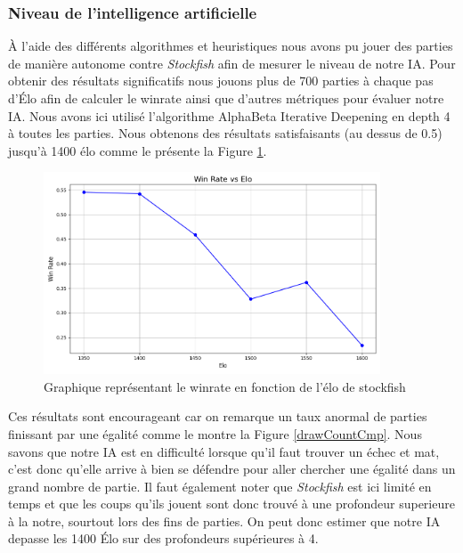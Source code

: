 \documentclass{article}
\begin{document}
\subsubsection{Niveau de l'intelligence artificielle}
À l'aide des différents algorithmes et heuristiques nous avons pu jouer des parties de manière autonome contre \textit{Stockfish} afin de mesurer le niveau de notre IA.
Pour obtenir des résultats significatifs nous jouons plus de 700 parties à chaque pas d'Élo afin de calculer le winrate ainsi que d'autres métriques pour évaluer notre IA.
Nous avons ici utilisé l'algorithme AlphaBeta Iterative Deepening en depth 4 à toutes les parties. Nous obtenons des résultats satisfaisants (au dessus de 0.5) jusqu’à 1400 élo comme le présente la Figure \ref{winRateCmp}.

\begin{figure}[h]
    \centering
    \includegraphics[width=\textwidth,height=6.0cm,keepaspectratio]{winRateCmp.png}
    \caption{Graphique représentant le winrate en fonction de l'élo de stockfish}
    \label{winRateCmp}
\end{figure}
\FloatBarrier

Ces résultats sont encourageant car on remarque un taux anormal de parties finissant par une égalité comme le montre la Figure \ref{drawCountCmp}. Nous savons que notre IA
est en difficulté lorsque qu'il faut trouver un échec et mat, c'est donc qu'elle arrive à bien se défendre pour aller chercher une égalité
dans un grand nombre de partie. Il faut également noter que \textit{Stockfish} est ici limité en temps et que les coups qu'ils jouent sont donc trouvé à une profondeur superieure à la notre,
sourtout lors des fins de parties. On peut donc estimer que notre IA depasse les 1400 Élo sur des profondeurs supérieures à 4.
\end{document}
